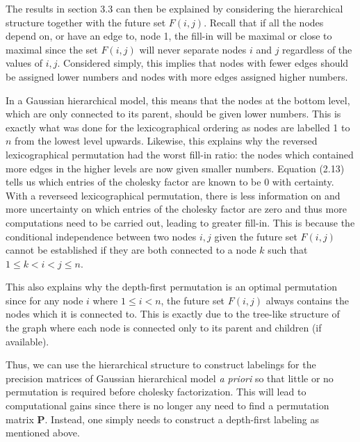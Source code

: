 \documentclass[]{article}
\begin{document}
The results in section 3.3 can then be explained by considering the
hierarchical structure together with the future set \(F(i,j)\). Recall
that if all the nodes depend on, or have an edge to, node 1, the fill-in
will be maximal or close to maximal since the set \(F(i,j)\) will never
separate nodes \(i\) and \(j\) regardless of the values of \(i,j\).
Considered simply, this implies that nodes with fewer edges should be
assigned lower numbers and nodes with more edges assigned higher
numbers.

In a Gaussian hierarchical model, this means that the nodes at the
bottom level, which are only connected to its parent, should be given
lower numbers. This is exactly what was done for the lexicographical
ordering as nodes are labelled 1 to \(n\) from the lowest level upwards.
Likewise, this explains why the reversed lexicographical permutation had
the worst fill-in ratio: the nodes which contained more edges in the
higher levels are now given smaller numbers. Equation (2.13) tells us
which entries of the cholesky factor are known to be 0 with certainty.
With a reverseed lexicographical permutation, there is less information
on and more uncertainty on which entries of the cholesky factor are zero
and thus more computations need to be carried out, leading to greater
fill-in. This is because the conditional independence between two nodes
\(i,j\) given the future set \(F(i,j)\) cannot be established if they
are both connected to a node \(k\) such that \(1\leq k<i<j\leq n\).

This also explains why the depth-first permutation is an optimal
permutation since for any node \(i\) where \(1\leq i<n\), the future set
\(F(i,j)\) always contains the nodes which it is connected to. This is
exactly due to the tree-like structure of the graph where each node is
connected only to its parent and children (if available).

Thus, we can use the hierarchical structure to construct labelings for
the precision matrices of Gaussian hierarchical model \emph{a priori} so
that little or no permutation is required before cholesky factorization.
This will lead to computational gains since there is no longer any need
to find a permutation matrix \(\boldsymbol{P}\). Instead, one simply
needs to construct a depth-first labeling as mentioned above.

\vspace{1.0cm}

 \newline 
\end{document}
